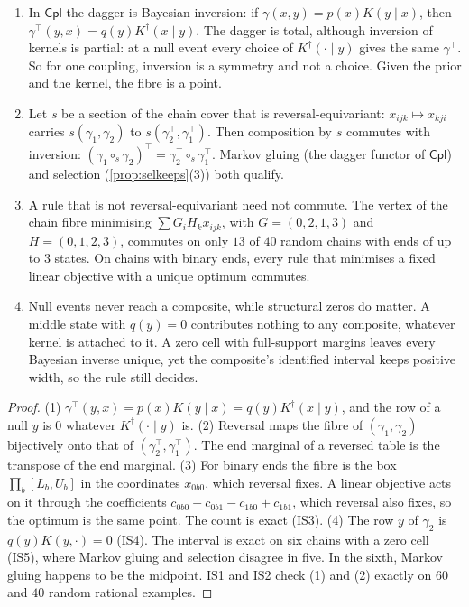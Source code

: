\documentclass[11pt]{article}
\theoremstyle{definition}\newtheorem{definition}[theorem]{Definition}\newtheorem{remark}[theorem]{Remark}\newtheorem{example}[theorem]{Example}\newtheorem{problem}[theorem]{Open problem}\crefname{problem}{Problem}{Problems}
\begin{document}
\begin{proposition}\label{prop:invsec}
\begin{enumerate}
\item[(1)] In $\mathsf{Cpl}$ the dagger is Bayesian inversion: if $\gamma(x,y)=p(x)K(y\mid x)$, then $\gamma^{\!\top}(y,x)=q(y)K^\dagger(x\mid y)$. The dagger is total, although inversion of kernels is partial: at a null event every choice of $K^\dagger(\cdot\mid y)$ gives the same $\gamma^{\!\top}$. So for one coupling, inversion is a symmetry and not a choice. Given the prior and the kernel, the fibre is a point.
\item[(2)] Let $s$ be a section of the chain cover that is reversal-equivariant: $x_{ijk}\mapsto x_{kji}$ carries $s(\gamma_1,\gamma_2)$ to $s(\gamma_2^{\!\top},\gamma_1^{\!\top})$. Then composition by $s$ commutes with inversion: $(\gamma_1\circ_s\gamma_2)^{\!\top}=\gamma_2^{\!\top}\circ_s\gamma_1^{\!\top}$. Markov gluing (the dagger functor of $\mathsf{Cpl}$) and selection (\cref{prop:selkeeps}(3)) both qualify.
\item[(3)] A rule that is not reversal-equivariant need not commute. The vertex of the chain fibre minimising $\sum G_iH_kx_{ijk}$, with $G=(0,2,1,3)$ and $H=(0,1,2,3)$, commutes on only $13$ of $40$ random chains with ends of up to $3$ states. On chains with binary ends, every rule that minimises a fixed linear objective with a unique optimum commutes.
\item[(4)] Null events never reach a composite, while structural zeros do matter. A middle state with $q(y)=0$ contributes nothing to any composite, whatever kernel is attached to it. A zero cell with full-support margins leaves every Bayesian inverse unique, yet the composite's identified interval keeps positive width, so the rule still decides.
\end{enumerate}
\end{proposition}

\begin{proof}
(1) $\gamma^{\!\top}(y,x)=p(x)K(y\mid x)=q(y)K^\dagger(x\mid y)$, and the row of a null $y$ is $0$ whatever $K^\dagger(\cdot\mid y)$ is. (2) Reversal maps the fibre of $(\gamma_1,\gamma_2)$ bijectively onto that of $(\gamma_2^{\!\top},\gamma_1^{\!\top})$. The end marginal of a reversed table is the transpose of the end marginal. (3) For binary ends the fibre is the box $\prod_b[L_b,U_b]$ in the coordinates $x_{0b0}$, which reversal fixes. A linear objective acts on it through the coefficients $c_{0b0}-c_{0b1}-c_{1b0}+c_{1b1}$, which reversal also fixes, so the optimum is the same point. The count is exact (IS3). (4) The row $y$ of $\gamma_2$ is $q(y)K(y,\cdot)=0$ (IS4). The interval is exact on six chains with a zero cell (IS5), where Markov gluing and selection disagree in five. In the sixth, Markov gluing happens to be the midpoint. IS1 and IS2 check (1) and (2) exactly on $60$ and $40$ random rational examples.
\end{proof}
\end{document}
